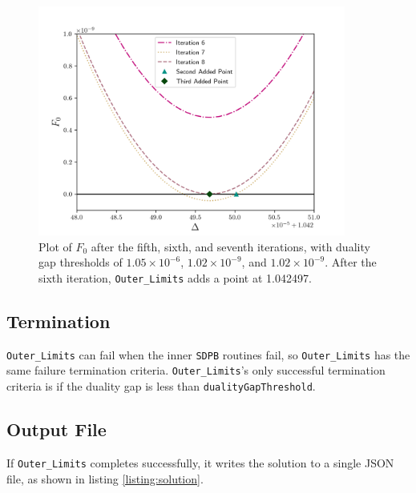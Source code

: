 \documentclass[12pt]{article}
\numberwithin{equation}{section}
\begin{document}
\begin{figure}
\begin{center}
\includegraphics[width=0.9\textwidth]{outer_plots_3}
\end{center}
\caption{Plot of $F_{0}$ after the fifth, sixth, and seventh
  iterations, with duality gap thresholds of $1.05\times10^{-6}$,
  $1.02\times10^{-9}$, and $1.02\times10^{-9}$.  After the sixth
  iteration, \texttt{Outer\_Limits} adds a point at 1.042497.}
\label{fig:plot3}
\end{figure}

\pagebreak

\subsection{Termination}

\texttt{Outer\_Limits} can fail when the inner \texttt{SDPB} routines
fail, so \texttt{Outer\_Limits} has the same failure termination
criteria.  \texttt{Outer\_Limits}'s only successful termination
criteria is if the duality gap is less than
\texttt{dualityGapThreshold}.

\pagebreak

\subsection{Output File}

If \texttt{Outer\_Limits} completes successfully, it writes the
solution to a single JSON file, as shown in listing
\ref{listing:solution}.
\end{document}
